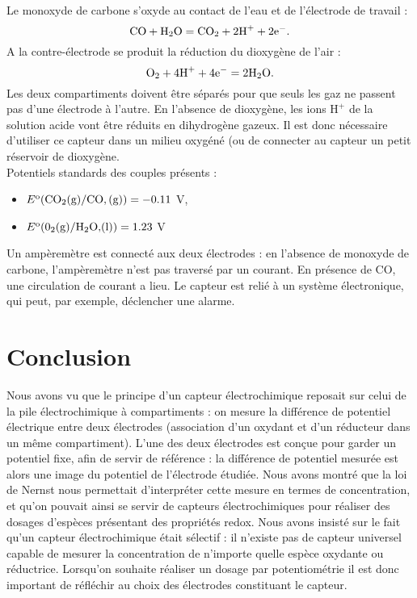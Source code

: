 \documentclass[11pt,a4paper]{report}
\begin{document}
Le monoxyde de carbone s'oxyde au contact de l'eau et de l'électrode de travail :
\begin{equation}
	\text{CO} + \text{H}_2\text{O} = \text{CO}_2 + 2\text{H}^+ + 2\text{e}^-.\\
\end{equation}
A la contre-électrode se produit la réduction du dioxygène de l'air :
\begin{equation}
	\text{O}_2 + 4\text{H}^+ + 4\text{e}^- = 2\text{H}_2\text{O}.\\ 
\end{equation}
Les deux compartiments doivent être séparés pour que seuls les gaz ne passent pas d'une électrode à l'autre. En l'absence de dioxygène, les ions $\text{H}^+$ de la solution acide vont être réduits en dihydrogène gazeux. Il est donc nécessaire d'utiliser ce capteur dans un milieu oxygéné (ou de connecter au capteur un petit réservoir de dioxygène.\\

Potentiels standards des couples présents :
\begin{itemize}
	\item $E\textsuperscript{o}(\text{CO}_2\text{(g)}/\text{CO},\text{(g)}) = -0.11$ V,
	\item $E\textsuperscript{o}(\text{0}_2\text{(g)}/\text{H}_2\text{O,(l)}) = 1.23$ V
\end{itemize}

Un ampèremètre est connecté aux deux électrodes : en l'absence de monoxyde de carbone, l'ampèremètre n'est pas traversé par un courant. En présence de CO, une circulation de courant a lieu. Le capteur est relié à un système électronique, qui peut, par exemple, déclencher une alarme.

\section*{Conclusion}

Nous avons vu que le principe d'un capteur électrochimique reposait sur celui de la pile électrochimique à compartiments : on mesure la différence de potentiel électrique entre deux électrodes (association d'un oxydant et d'un réducteur dans un même compartiment). L'une des deux électrodes est conçue pour garder un potentiel fixe, afin de servir de référence : la différence de potentiel mesurée est alors une image du potentiel de l'électrode étudiée. Nous avons montré que la loi de Nernst nous permettait d'interpréter cette mesure en termes de concentration, et qu'on pouvait ainsi se servir de capteurs électrochimiques pour réaliser des dosages d'espèces présentant des propriétés redox. Nous avons insisté sur le fait qu'un capteur électrochimique était sélectif : il n'existe pas de capteur universel capable de mesurer la concentration de n'importe quelle espèce oxydante ou réductrice. Lorsqu'on souhaite réaliser un dosage par potentiométrie il est donc important de réfléchir au choix des électrodes constituant le capteur.
\end{document}
